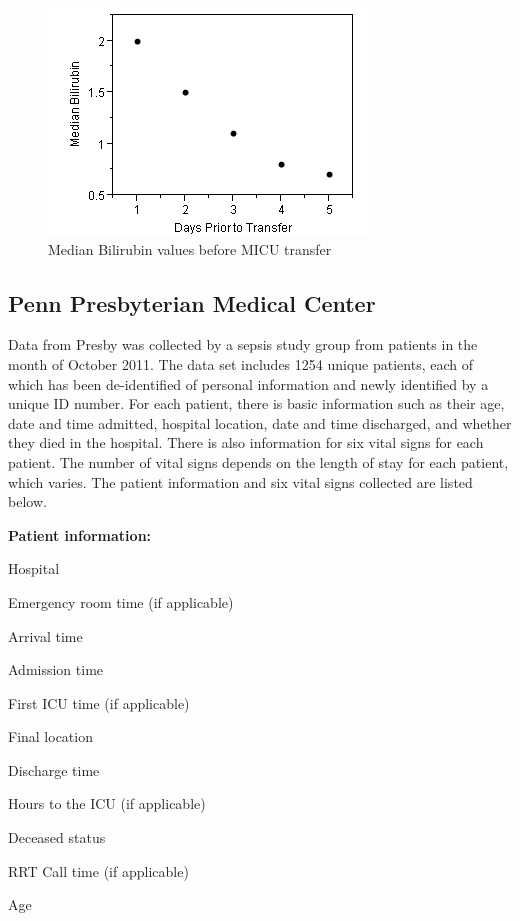 \documentclass{sig-alternate}
\begin{document}
\begin{figure}
	\begin{center}
		\includegraphics[width=1.0\linewidth]{BilirubinGraph.png}
	\end{center}
	\caption{Median Bilirubin values before MICU transfer}
	\label{fig:bilirubin}
\end{figure}

\vspace{10pt}
\subsection{Penn Presbyterian Medical Center}
\label{subsec:presby}
\vspace{10pt}

Data from Presby was collected by a sepsis study group from patients in the month of October 2011.  The data set includes 1254 unique patients, each of which has been de-identified of personal information and newly identified by a unique ID number.  For each patient, there is basic information such as their age, date and time admitted, hospital location, date and time discharged, and whether they died in the hospital.  There is also information for six vital signs for each patient.  The number of vital signs depends on the length of stay for each patient, which varies.  The patient information and six vital signs collected are listed below.
\linebreak

\noindent \textbf{Patient information:}
\begin{itemize*}
  \item Hospital
  \item Emergency room time (if applicable)
  \item Arrival time
  \item Admission time
  \item First ICU time (if applicable)
  \item Final location
  \item Discharge time
  \item Hours to the ICU (if applicable)
  \item Deceased status
  \item RRT Call time (if applicable)
  \item Age
\end{itemize*}
\end{document}

